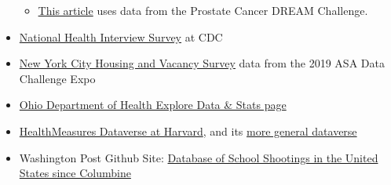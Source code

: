 \documentclass[]{book}
\providecommand{\tightlist}{%
  \setlength{\itemsep}{0pt}\setlength{\parskip}{0pt}}
\begin{document}
\begin{itemize}
  \begin{itemize}
  \tightlist
  \item
    \href{https://www.ncbi.nlm.nih.gov/pmc/articles/PMC5130083/}{This article} uses data from the Prostate Cancer DREAM Challenge.
  \end{itemize}
\item
  \href{https://www.cdc.gov/nchs/nhis/index.htm}{National Health Interview Survey} at CDC
\item
  \href{https://www1.nyc.gov/site/hpd/about/nychvs-asa-data-challenge-expo.page}{New York City Housing and Vacancy Survey} data from the 2019 ASA Data Challenge Expo
\item
  \href{https://odh.ohio.gov/wps/portal/gov/odh/explore-data-and-stats}{Ohio Department of Health Explore Data \& Stats page}
\item
  \href{https://dataverse.harvard.edu/dataverse/HealthMeasures}{HealthMeasures Dataverse at Harvard}, and its \href{https://dataverse.harvard.edu/dataverse/harvard}{more general dataverse}
\item
  Washington Post Github Site: \href{https://github.com/washingtonpost/data-school-shootings}{Database of School Shootings in the United States since Columbine}


\end{itemize}
\end{document}
